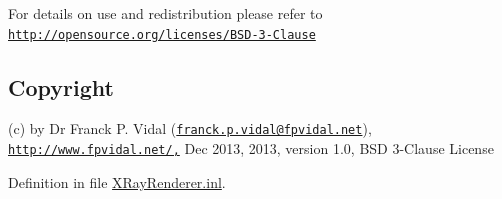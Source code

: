 For details on use and redistribution please refer to \href{http://opensource.org/licenses/BSD-3-Clause}{\tt http://opensource.org/licenses/BSD-\/3-\/Clause}\hypertarget{_x_ray_renderer_8inl_Copyright}{}\subsection{Copyright}\label{_x_ray_renderer_8inl_Copyright}
(c) by Dr Franck P. Vidal (\href{mailto:franck.p.vidal@fpvidal.net}{\tt franck.p.vidal@fpvidal.net}), \href{http://www.fpvidal.net/,}{\tt http://www.fpvidal.net/,} Dec 2013, 2013, version 1.0, BSD 3-\/Clause License 

Definition in file \hyperlink{_x_ray_renderer_8inl_source}{XRayRenderer.inl}.

